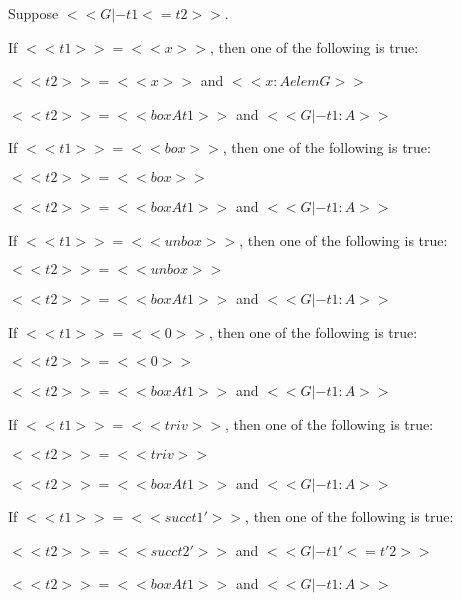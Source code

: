 \begin{lemma}
  \label{lemma:inversion_for_term_precision_for_core_grady}
  Suppose $<<G |- t1 <= t2>>$.
  \begin{enumR} \small
  \item If $<<t1>> = <<x>>$, then one of the following is true:
    \begin{enumA}
    \item $<<t2>> = <<x>>$ and $<<x : A elem G>>$
    \item $<<t2>> = <<box A t1>>$ and $<<G |- t1 : A>>$
    \end{enumA}

  \item If $<<t1>> = <<box>>$, then one of the following is true:
    \begin{enumA}
    \item $<<t2>> = <<box>>$
    \item $<<t2>> = <<box A t1>>$ and $<<G |- t1 : A>>$
    \end{enumA}

  \item If $<<t1>> = <<unbox>>$, then one of the following is true:
    \begin{enumA}
    \item $<<t2>> = <<unbox>>$
    \item $<<t2>> = <<box A t1>>$ and $<<G |- t1 : A>>$
    \end{enumA}

  \item If $<<t1>> = <<0>>$, then one of the following is true:
    \begin{enumA}
    \item $<<t2>> = <<0>>$
    \item $<<t2>> = <<box A t1>>$ and $<<G |- t1 : A>>$
    \end{enumA}

  \item If $<<t1>> = <<triv>>$, then one of the following is true:
    \begin{enumA}
    \item $<<t2>> = <<triv>>$
    \item $<<t2>> = <<box A t1>>$ and $<<G |- t1 : A>>$
    \end{enumA}

  \item If $<<t1>> = <<succ t1'>>$, then one of the following is true:
    \begin{enumA}
    \item $<<t2>> = <<succ t2'>>$ and $<<G |- t1' <= t'2>>$
    \item $<<t2>> = <<box A t1>>$ and $<<G |- t1 : A>>$
    \end{enumA}


\end{enumR}
\end{lemma}
